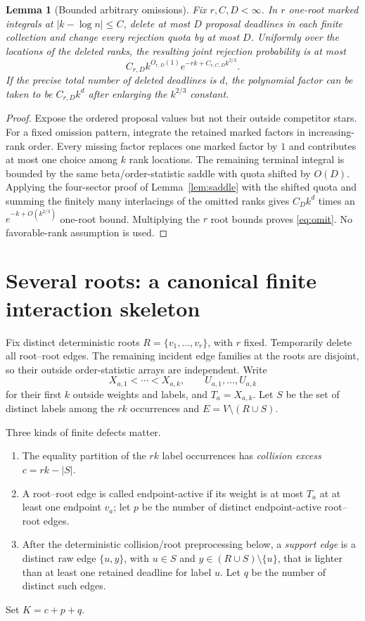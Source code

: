 \documentclass[11pt]{article}
\newtheorem{lemma}[theorem]{Lemma}
\newcommand{\1}{\mathbf 1}
\begin{document}
\begin{lemma}[Bounded arbitrary omissions]\label{lem:omit}
Fix $r,C,D<\infty$.  In $r$ one-root marked integrals at $|k-\log n|\le C$, delete at
most $D$ proposal deadlines in each finite collection and change every rejection quota by
at most $D$.  Uniformly over the locations of the deleted ranks, the resulting joint
rejection probability is at most
\begin{equation}\label{eq:omit}
 C_{r,D}k^{O_{r,D}(1)}e^{-rk+C_{r,C,D}k^{2/3}}.
\end{equation}
If the precise total number of deleted deadlines is $d$, the polynomial factor can be
taken to be $C_{r,D}k^d$ after enlarging the $k^{2/3}$ constant.
\end{lemma}

\begin{proof}
Expose the ordered proposal values but not their outside competitor stars.  For a fixed
omission pattern, integrate the retained marked factors in increasing-rank order.
Every missing factor replaces one marked factor by $1$ and contributes at most one choice
among $k$ rank locations.  The remaining terminal integral is bounded by the same
beta/order-statistic saddle with quota shifted by $O(D)$.  Applying the four-sector proof
of Lemma~\ref{lem:saddle} with the shifted quota and summing the finitely many interlacings
of the omitted ranks gives $C_Dk^d$ times an $e^{-k+O(k^{2/3})}$ one-root bound.
Multiplying the $r$ root bounds proves \eqref{eq:omit}.  No favorable-rank assumption is
used.
\end{proof}

\section{Several roots: a canonical finite interaction skeleton}

Fix distinct deterministic roots $R=\{v_1,\ldots,v_r\}$, with $r$ fixed.  Temporarily
delete all root--root edges.  The remaining incident edge families at the roots are
disjoint, so their outside order-statistic arrays are independent.  Write
\[
 X_{a,1}<\cdots<X_{a,k},\qquad U_{a,1},\ldots,U_{a,k}
\]
for their first $k$ outside weights and labels, and $T_a=X_{a,k}$.
Let $S$ be the set of distinct labels among the $rk$ occurrences and
$E=V\setminus(R\cup S)$.

Three kinds of finite defects matter.
\begin{enumerate}[label=(\roman*)]
\item The equality partition of the $rk$ label occurrences has \emph{collision excess}
$c=rk-|S|$.
\item A root--root edge is called endpoint-active if its weight is at most $T_a$ at at
least one endpoint $v_a$; let $p$ be the number of distinct endpoint-active root--root
edges.
\item After the deterministic collision/root preprocessing below, a \emph{support edge}
is a distinct raw edge $\{u,y\}$, with $u\in S$ and
$y\in(R\cup S)\setminus\{u\}$, that is lighter than at least one retained deadline for
label $u$.  Let $q$ be the number of distinct such edges.
\end{enumerate}
Set $K=c+p+q$.
\end{document}
